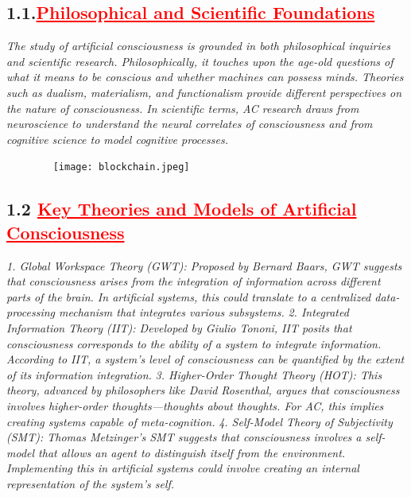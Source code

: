 \documentclass[12pt]{article}
\begin{document}
\subsection*{\textbf{\hspace{1cm}1.1.\hspace{1cm}\textcolor{red}{\underline{\large{Philosophical and Scientific Foundations}}}}}
\hspace{1cm}\large{\emph{The study of artificial consciousness is grounded in both philosophical inquiries and scientific research. Philosophically, it touches upon the age-old questions of what it means to be conscious and whether machines can possess minds. Theories such as dualism, materialism, and functionalism provide different perspectives on the nature of consciousness. In scientific terms, AC research draws from neuroscience to understand the neural correlates of consciousness and from cognitive science to model cognitive processes.}}\vspace{1cm}\newline

\begin{figure}
    \centering
    \texttt{[image: blockchain.jpeg]}
\end{figure}
\newpage
\subsection*{\textbf{1.2 \textcolor{red}{\underline{\large{Key Theories and Models of Artificial Consciousness}}}}}
\hspace{1cm}\large{\emph{1. Global Workspace Theory (GWT): Proposed by Bernard Baars, GWT suggests that consciousness arises from the integration of information across different parts of the brain. In artificial systems, this could translate to a centralized data-processing mechanism that integrates various subsystems.}}\vspace{1cm}\newline
\hspace{1cm}\large{\emph{2. Integrated Information Theory (IIT): Developed by Giulio Tononi, IIT posits that consciousness corresponds to the ability of a system to integrate information. According to IIT, a system's level of consciousness can be quantified by the extent of its information integration.}}\vspace{1cm}\newline
\hspace{1cm}\large{\emph{3. Higher-Order Thought Theory (HOT): This theory, advanced by philosophers like David Rosenthal, argues that consciousness involves higher-order thoughts—thoughts about thoughts. For AC, this implies creating systems capable of meta-cognition.}}\vspace{1cm}\newline
\hspace{1cm}\large{\emph{4. Self-Model Theory of Subjectivity (SMT): Thomas Metzinger’s SMT suggests that consciousness involves a self-model that allows an agent to distinguish itself from the environment. Implementing this in artificial systems could involve creating an internal representation of the system's self.}}\vspace{1cm}\newline
\end{document}
